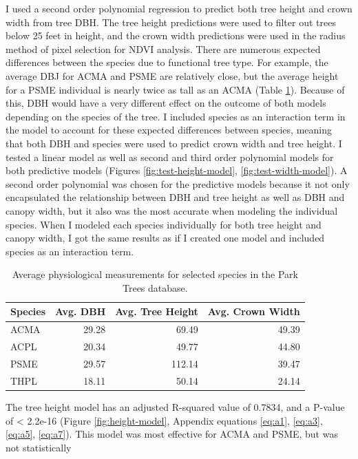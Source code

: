 \documentclass[12pt,twoside]{reedthesis}
\begin{document}
I used a second order polynomial regression to predict both tree height
and crown width from tree DBH. The tree height predictions were used to
filter out trees below 25 feet in height, and the crown width
predictions were used in the radius method of pixel selection for NDVI
analysis. There are numerous expected differences between the species
due to functional tree type. For example, the average DBJ for ACMA and
PSME are relatively close, but the average height for a PSME individual
is nearly twice as tall as an ACMA (Table \ref{tab:tree-stats-table}).
Because of this, DBH would have a very different effect on the outcome
of both models depending on the species of the tree. I included species
as an interaction term in the model to account for these expected
differences between species, meaning that both DBH and species were used
to predict crown width and tree height. I tested a linear model as well
as second and third order polynomial models for both predictive models
(Figures \ref{fig:test-height-model}, \ref{fig:test-width-model}). A
second order polynomial was chosen for the predictive models because it
not only encapsulated the relationship between DBH and tree height as
well as DBH and canopy width, but it also was the most accurate when
modeling the individual species. When I modeled each species
individually for both tree height and canopy width, I got the same
results as if I created one model and included species as an interaction
term.
\begin{table}

\caption[Physiological Tree Measurements]{\label{tab:tree-stats-table}Average physiological measurements for selected species in the Park Trees database.}
\centering
\begin{tabular}[t]{lrrr}
\toprule
Species & Avg. DBH & Avg. Tree Height & Avg. Crown Width\\
\midrule
ACMA & 29.28 & 69.49 & 49.39\\
ACPL & 20.34 & 49.77 & 44.80\\
PSME & 29.57 & 112.14 & 39.47\\
THPL & 18.11 & 50.14 & 24.14\\
\bottomrule
\end{tabular}
\end{table}
The tree height model has an adjusted R-squared value of 0.7834, and a
P-value of \textless{} 2.2e-16 (Figure \ref{fig:height-model}, Appendix
equations \eqref{eq:a1}, \eqref{eq:a3}, \eqref{eq:a5}, \eqref{eq:a7}). This
model was most effective for ACMA and PSME, but was not statistically
\end{document}
